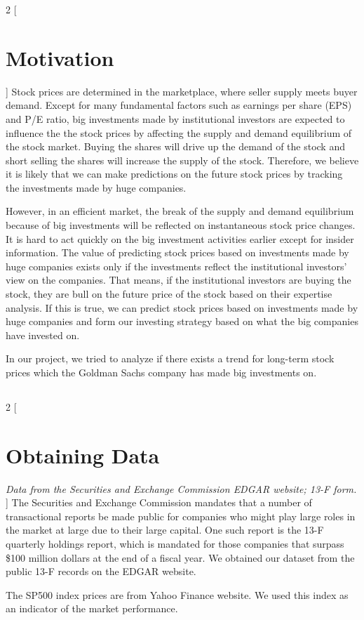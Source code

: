 \documentclass{article}
\begin{document}
\begin{multicols}{2}
[\section*{Motivation} \textit{}]
Stock prices are determined in the marketplace, where seller supply meets buyer demand. Except for many fundamental factors such as earnings per share (EPS) and P/E ratio, big investments made by institutional investors are expected to influence the the stock prices by affecting the supply and demand equilibrium of the stock market. Buying the shares will drive up the demand of the stock and short selling the shares will increase the supply of the stock. Therefore, we believe it is likely that we can make predictions on the future stock prices by tracking the investments made by huge companies.

However, in an efficient market, the break of the supply and demand equilibrium because of big investments will be reflected on instantaneous stock price changes. It is hard to act quickly on the big investment activities earlier except for insider information. The value of predicting stock prices based on investments made by huge companies exists only if the investments reflect the institutional investors' view on the companies. That means, if the institutional investors are buying the stock, they are bull on the future price of the stock based on their expertise analysis. If this is true, we can predict stock prices based on investments made by huge companies and form our investing strategy based on what the big companies have invested on.

In our project, we tried to analyze if there exists a trend for long-term stock prices which the Goldman Sachs company has made big investments on. 
\subsection*{}
\end{multicols}

\begin{multicols}{2}
[\section*{Obtaining Data}\textit{Data from the Securities and Exchange Commission EDGAR website; 13-F form.} ]
The Securities and Exchange Commission mandates that a number of transactional reports be made public for companies who might play large roles in the market at large due to their large capital. One such report is the 13-F quarterly holdings report, which is mandated for those companies that surpass \$100 million dollars at the end of a fiscal year. We obtained our dataset from the public 13-F records on the EDGAR website.

The SP500 index prices are from Yahoo Finance website. We used this index as an indicator of the market performance.
\end{multicols}
\end{document}
